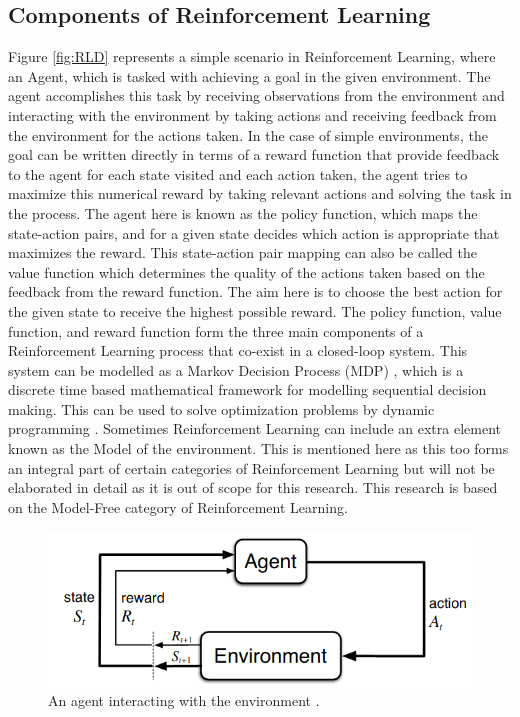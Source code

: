\subsection{Components of Reinforcement Learning}

Figure \ref{fig:RLD} represents a simple scenario in Reinforcement Learning, where an Agent, which is tasked with achieving a goal in the given environment. The agent accomplishes this task by receiving observations from the environment and interacting with the environment by taking actions and receiving feedback from the environment for the actions taken. In the case of simple environments, the goal can be written directly in terms of a reward function that provide feedback to the agent for each state visited and each action taken, the agent tries to maximize this numerical reward by taking relevant actions and solving the task in the process. The agent here is known as the policy function, which maps the state-action pairs, and for a given state decides which action is appropriate that maximizes the reward. This state-action pair mapping can also be called the value function which determines the quality of the actions taken based on the feedback from the reward function. The aim here is to choose the best action for the given state to receive the highest possible reward. The policy function, value function, and reward function form the three main components of a Reinforcement Learning process that co-exist in a closed-loop system. This system can be modelled as a Markov Decision Process (MDP) \cite{Sutton1998} \cite{FMDP}, which is a discrete time based mathematical framework for modelling sequential decision making. This can be used to solve optimization problems by dynamic programming \cite{DPBE}. Sometimes Reinforcement Learning can include an extra element known as the Model of the environment. This is mentioned here as this too forms an integral part of certain categories of Reinforcement Learning but will not be elaborated in detail as it is out of scope for this research. This research is based on the Model-Free category of Reinforcement Learning. \\

\begin{figure}[h!]
    \centering
    \includegraphics[width=\textwidth]{images/HMM.png}
    \caption{An agent interacting with the environment \cite{Sutton1998}.}
    \label{fig:HMM}
\end{figure}

